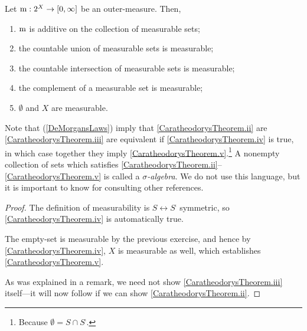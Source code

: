 \begin{thm}\label{CaratheodorysTheorem}
\begin{savenotes}
Let $\mathrm{m} :2^X\rightarrow [0,\infty ]$ be an outer-measure.  Then,
\begin{enumerate}
\item \label{CaratheodorysTheorem.i}$\mathrm{m}$ is additive on the collection of measurable sets;
\item \label{CaratheodorysTheorem.ii}the countable union of measurable sets is measurable;
\item \label{CaratheodorysTheorem.iii}the countable intersection of measurable sets is measurable;
\item \label{CaratheodorysTheorem.iv}the complement of a measurable set is measurable;
\item \label{CaratheodorysTheorem.v}$\emptyset$ and $X$ are measurable.
\end{enumerate}
\begin{rmk}
Note that  (\cref{DeMorgansLaws}) imply that \ref{CaratheodorysTheorem.ii} are \ref{CaratheodorysTheorem.iii} are equivalent if \ref{CaratheodorysTheorem.iv} is true, in which case together they imply \ref{CaratheodorysTheorem.v}.\footnote{Because $\emptyset =S\cap S^{\comp}$.}  A nonempty collection of sets which satisfies \ref{CaratheodorysTheorem.ii}--\ref{CaratheodorysTheorem.v} is called a \emph{$\sigma$-algebra}.  We do not use this language, but it is important to know for consulting other references.
\end{rmk}
\begin{proof}
The definition of measurability is $S\leftrightarrow S^{\comp}$ symmetric, so \ref{CaratheodorysTheorem.iv} is automatically true.

The empty-set is measurable by the previous exercise, and hence by \ref{CaratheodorysTheorem.iv}, $X$ is measurable as well, which establishes \ref{CaratheodorysTheorem.v}.

As was explained in a remark, we need not show \ref{CaratheodorysTheorem.iii} itself---it will now follow if we can show \ref{CaratheodorysTheorem.ii}.


\end{proof}
\end{savenotes}
\end{thm}
